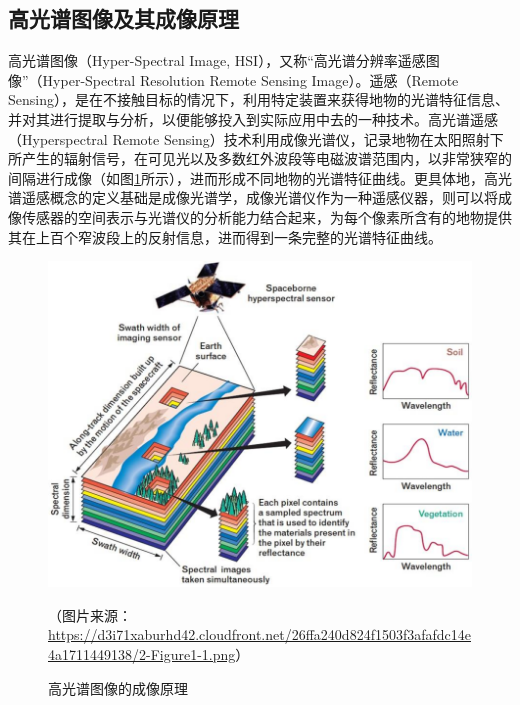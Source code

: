\documentclass[12pt, a4paper]{article}
\begin{document}
\subsection{高光谱图像及其成像原理}
\par 高光谱图像（Hyper-Spectral Image, HSI），又称“高光谱分辨率遥感图像”（Hyper-Spectral Resolution Remote Sensing Image）。遥感（Remote Sensing），是在不接触目标的情况下，利用特定装置来获得地物的光谱特征信息、并对其进行提取与分析，以便能够投入到实际应用中去的一种技术\cite{whatishsi}。高光谱遥感（Hyperspectral  Remote Sensing）技术利用成像光谱仪，记录地物在太阳照射下所产生的辐射信号，在可见光以及多数红外波段等电磁波谱范围内，以非常狭窄的间隔进行成像（如图\ref{img-pricipleofphotograph}所示），进而形成不同地物的光谱特征曲线。更具体地，高光谱遥感概念的定义基础是成像光谱学，成像光谱仪作为一种遥感仪器，则可以将成像传感器的空间表示与光谱仪的分析能力结合起来，为每个像素所含有的地物提供其在上百个窄波段上的反射信息，进而得到一条完整的光谱特征曲线\cite{howtogenanhsi}。
\begin{figure}[h]
\centering
\includegraphics[scale=0.4]{img-principleofphotograph.png}
\caption{高光谱图像的成像原理}
{\scriptsize{（图片来源：{\url{https://d3i71xaburhd42.cloudfront.net/26ffa240d824f1503f3afafdc14e4a1711449138/2-Figure1-1.png}}）}}
\label{img-pricipleofphotograph}
\end{figure}
\end{document}
